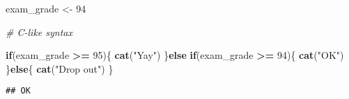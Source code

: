 \documentclass[
]{article}
\newenvironment{Shaded}{\begin{snugshade}}{\end{snugshade}}
\newcommand{\CommentTok}[1]{\textcolor[rgb]{0.56,0.35,0.01}{\textit{#1}}}
\newcommand{\ControlFlowTok}[1]{\textcolor[rgb]{0.13,0.29,0.53}{\textbf{#1}}}
\newcommand{\DecValTok}[1]{\textcolor[rgb]{0.00,0.00,0.81}{#1}}
\newcommand{\FunctionTok}[1]{\textcolor[rgb]{0.13,0.29,0.53}{\textbf{#1}}}
\newcommand{\NormalTok}[1]{#1}
\newcommand{\OtherTok}[1]{\textcolor[rgb]{0.56,0.35,0.01}{#1}}
\newcommand{\SpecialCharTok}[1]{\textcolor[rgb]{0.81,0.36,0.00}{\textbf{#1}}}
\newcommand{\StringTok}[1]{\textcolor[rgb]{0.31,0.60,0.02}{#1}}
\begin{document}
\begin{Shaded}
\begin{Highlighting}[]
\NormalTok{exam\_grade }\OtherTok{\textless{}{-}} \DecValTok{94}

\CommentTok{\# C{-}like syntax}

\ControlFlowTok{if}\NormalTok{(exam\_grade }\SpecialCharTok{\textgreater{}=} \DecValTok{95}\NormalTok{)\{}
  \FunctionTok{cat}\NormalTok{(}\StringTok{"Yay"}\NormalTok{)}
\NormalTok{\}}\ControlFlowTok{else} \ControlFlowTok{if}\NormalTok{(exam\_grade }\SpecialCharTok{\textgreater{}=} \DecValTok{94}\NormalTok{)\{}
  \FunctionTok{cat}\NormalTok{(}\StringTok{"OK"}\NormalTok{)}
\NormalTok{\}}\ControlFlowTok{else}\NormalTok{\{}
  \FunctionTok{cat}\NormalTok{(}\StringTok{"Drop out"}\NormalTok{)}
\NormalTok{\}}
\end{Highlighting}
\end{Shaded}

\begin{verbatim}
## OK
\end{verbatim}
\end{document}
